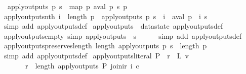 \begin{isabellebody}
\ \ {\isachardoublequoteopen}apply{\isacharunderscore}outputs\ p\ s\ {\isacharequal}\ map\ {\isacharparenleft}{\isasymlambda}p{\isachardot}\ aval\ p\ s{\isacharparenright}\ p{\isachardoublequoteclose}\isanewline
\isanewline
{}\isamarkupfalse%
\ apply{\isacharunderscore}outputs{\isacharunderscore}nth{\isacharcolon}\ {\isachardoublequoteopen}i\ {\isacharless}\ length\ p\ {\isasymLongrightarrow}\ apply{\isacharunderscore}outputs\ p\ s\ {\isacharbang}\ i\ {\isacharequal}\ aval\ {\isacharparenleft}p\ {\isacharbang}\ i{\isacharparenright}\ s{\isachardoublequoteclose}\isanewline
%
\isadelimproof
\ \ %
\endisadelimproof
%
\isatagproof
{}\isamarkupfalse%
\ {\isacharparenleft}simp\ add{\isacharcolon}\ apply{\isacharunderscore}outputs{\isacharunderscore}def{\isacharparenright}%
\endisatagproof
{\isafoldproof}%
%
\isadelimproof
\isanewline
%
\endisadelimproof
\isanewline
{}\isamarkupfalse%
\ apply{\isacharunderscore}outputs\ {\isacharequal}\ datastate\ apply{\isacharunderscore}outputs{\isacharunderscore}def\isanewline
\isanewline
{}\isamarkupfalse%
\ apply{\isacharunderscore}outputs{\isacharunderscore}empty\ {\isacharbrackleft}simp{\isacharbrackright}{\isacharcolon}\ {\isachardoublequoteopen}apply{\isacharunderscore}outputs\ {\isacharbrackleft}{\isacharbrackright}\ s\ {\isacharequal}\ {\isacharbrackleft}{\isacharbrackright}{\isachardoublequoteclose}\isanewline
%
\isadelimproof
\ \ %
\endisadelimproof
%
\isatagproof
{}\isamarkupfalse%
\ {\isacharparenleft}simp\ add{\isacharcolon}\ apply{\isacharunderscore}outputs{\isacharunderscore}def{\isacharparenright}%
\endisatagproof
{\isafoldproof}%
%
\isadelimproof
\isanewline
%
\endisadelimproof
\isanewline
{}\isamarkupfalse%
\ apply{\isacharunderscore}outputs{\isacharunderscore}preserves{\isacharunderscore}length{\isacharcolon}\ {\isachardoublequoteopen}length\ {\isacharparenleft}apply{\isacharunderscore}outputs\ p\ s{\isacharparenright}\ {\isacharequal}\ length\ p{\isachardoublequoteclose}\isanewline
%
\isadelimproof
\ \ %
\endisadelimproof
%
\isatagproof
{}\isamarkupfalse%
\ {\isacharparenleft}simp\ add{\isacharcolon}\ apply{\isacharunderscore}outputs{\isacharunderscore}def{\isacharparenright}%
\endisatagproof
{\isafoldproof}%
%
\isadelimproof
\isanewline
%
\endisadelimproof
\isanewline
{}\isamarkupfalse%
\ apply{\isacharunderscore}outputs{\isacharunderscore}literal{\isacharcolon}\ {\isachardoublequoteopen}P\ {\isacharbang}\ r\ {\isacharequal}\ L\ v\ {\isasymLongrightarrow}\isanewline
\ \ \ \ \ \ \ r\ {\isacharless}\ length\ {\isacharparenleft}apply{\isacharunderscore}outputs\ P\ {\isacharparenleft}join{\isacharunderscore}ir\ i\ c{\isacharparenright}{\isacharparenright}\ {\isasymLongrightarrow}\isanewline

\end{isabellebody}
